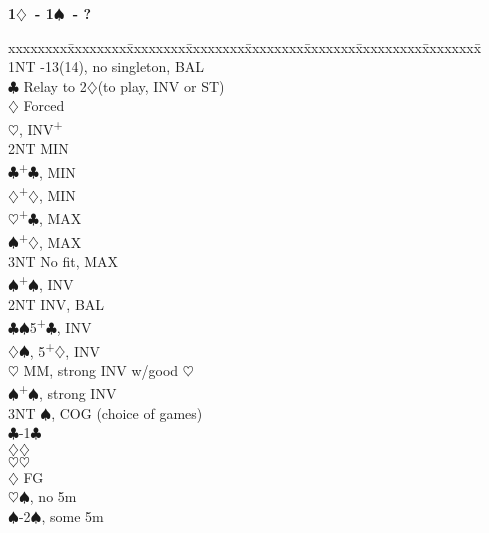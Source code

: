 \documentclass[10pt]{article}
\renewcommand{\c}{$\clubsuit$}
\renewcommand{\d}{$\diamondsuit$}
\newcommand{\h}{$\heartsuit$}
\newcommand{\s}{$\spadesuit$}
\newcommand{\p}{\textsuperscript{+}}
\newenvironment{bidtable}[1][]
{\textbf{#1}
  \begin{adjustwidth}{1em}{}
    \addvspace{2pt}
    \begin{tabbing}
      xxxxxxxx\=xxxxxxxx\=xxxxxxxx\=xxxxxxxx\=xxxxxxxx\=xxxxxxx\=xxxxxxxxx\=xxxxxxxx\=\kill}
{\end{tabbing}\end{adjustwidth}\bigskip}%
\begin{document}
\begin{bidtable}[1\d\ - 1\s\ - ?]
1NT  -13(14), no singleton, BAL                               \\
     \c  \> Relay to 2\d (to play, INV or ST)                  \\
     \>      \d \> Forced                                      \\
     \>      \>     \h  {}, INV\p                         \\
     \>      \>     \>      \> 2NT \> MIN                          \\
     \>      \>     \>      \c {}\p\c, MIN                   \\
     \>      \>     \>      \d {}\p\d, MIN                   \\
     \>      \>     \>      \h {}\p\c, MAX                   \\
     \>      \>     \>      \s {}\p\d, MAX                   \\
     \>      \>     \>      \> 3NT \> No fit, MAX                  \\
     \>      \>     \s  {}\p\s, INV                          \\
     \>      \>     \> 2NT  \> INV, BAL                            \\
     \>      \>     \c  {}\s 5\p\c, INV                      \\
     \>      \>     \d  {}\s, 5\p\d, INV                     \\
     \>      \>     \h  {} MM, strong INV w/good \h         \\
     \>      \>     \s  {}\p\s, strong INV                   \\
     \>      \>     \> 3NT  \s, COG (choice of games)          \\
     \>      \>     \c  {}-1\c                               \\
     \>      \>     \d  {}\d                                 \\
     \>      \>     \h  {}\h                                 \\
     \d  \> FG                                                 \\
     \>      \h {}\s, no 5m                                  \\
     \>      \s {}-2\s, some 5m                              \\

\end{bidtable}
\end{document}
